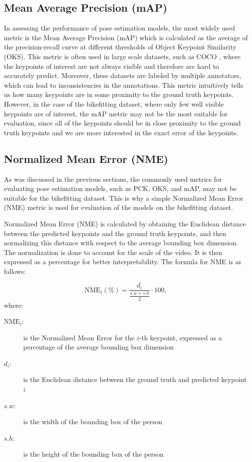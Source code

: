 \subsection{Mean Average Precision (mAP)}

In assessing the performance of pose estimation models, the most widely used metric is the Mean Average Precision (mAP) which is calculated as the average of the precision-recall curve at different thresholds of Object Keypoint Similarity (OKS). This metric is often used in large scale datasets, such as COCO \cite{coco}, where the keypoints of interest are not always visible and therefore are hard to accurately predict. Moreover, these datasets are labeled by multiple annotators, which can lead to inconsistencies in the annotations.
This metric intuitively tells us how many keypoints are in some proximity to the ground truth keypoints. However, in the case of the bikefitting dataset, where only few well visible keypoints are of interest, the mAP metric may not be the most suitable for evaluation, since all of the keypoints should be in close proximity to the ground truth keypoints and we are more interested in the exact error of the keypoints.


\subsection{Normalized Mean Error (NME)}
\label{nme}
As was discussed in the previous sections, the commonly used metrics for evaluating pose estimation models, such as PCK, OKS, and mAP, may not be suitable for the bikefitting dataset. This is why a simple Normalized Mean Error (NME) metric is used for evaluation of the models on the bikefitting dataset.


Normalized Mean Error (NME) is calculated by obtaining the Euclidean distance between the predicted keypoints and the ground truth keypoints, and then normalizing this distance with respect to the average bounding box dimension. The normalization is done to account for the scale of the video. It is then expressed as a percentage for better interpretability. The formula for NME is as follows:

$$ \text{NME}_i (\%)= \frac{d_i}{\frac{{s.w} + {s.h}}{2}} \cdot 100, $$
%
where:
\begin{description}
    \item[$\text{NME}_i$:] is the Normalized Mean Error for the $i$-th keypoint, expressed as a percentage of the average bounding box dimension
    \item[$d_i$:] is the Euclidean distance between the ground truth and predicted keypoint $i$
    \item[$s.w$:] is the width of the bounding box of the person
    \item[$s.h$:] is the height of the bounding box of the person
\end{description}

